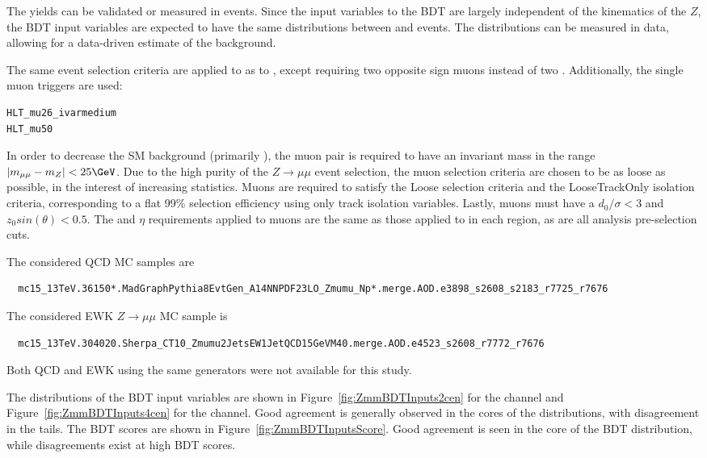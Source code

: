 \label{sec:zjets}
The \zjets{} yields can be validated or measured in \zmujets{} events. 
Since the input variables to the BDT are largely independent of the kinematics of the $Z$, 
the BDT input variables are expected to have the same distributions between \zmujets{} and \zjets{} events.
The \zmujets{} distributions can be measured in data, allowing for a data-driven estimate of the \zjets{} background.

The same event selection criteria are applied to \zmujets{} as to \zjets{}, except requiring two opposite sign muons 
instead of two \bjets.  Additionally, the single muon triggers are used:
\begin{verbatim}
HLT_mu26_ivarmedium
HLT_mu50
\end{verbatim}
In order to decrease the SM background (primarily \ttbar), the muon pair is required to have an invariant mass in the range $|m_{\mu\mu}-m_{Z}|<25\GeV$.
Due to the high purity of the $Z\rightarrow\mu\mu$ event selection, 
the muon selection criteria are chosen to be as loose as possible, in the interest of increasing statistics.
Muons are required to satisfy the Loose selection criteria and the LooseTrackOnly isolation criteria, 
corresponding to a flat 99\% selection efficiency using only track isolation variables.
Lastly, muons must have a $d_0/\sigma<3$ and $z_0sin(\theta)<0.5$.
The \pT and $\eta$ requirements applied to muons are the same as those applied to \bjets in each region, as are all analysis pre-selection cuts.  %

The considered QCD \zmujets{} MC samples are 
{
\scriptsize
\begin{verbatim}
  mc15_13TeV.36150*.MadGraphPythia8EvtGen_A14NNPDF23LO_Zmumu_Np*.merge.AOD.e3898_s2608_s2183_r7725_r7676
\end{verbatim}
}

The considered EWK $Z\rightarrow\mu\mu$ MC sample is
{
\scriptsize
\begin{verbatim}
  mc15_13TeV.304020.Sherpa_CT10_Zmumu2JetsEW1JetQCD15GeVM40.merge.AOD.e4523_s2608_r7772_r7676
\end{verbatim}
}

Both QCD and EWK \zmujets{} using the same generators were not available for this study.


The distributions of the BDT input variables are shown in Figure~\ref{fig:ZmmBDTInputs2cen} for the \twocentral channel and 
Figure~\ref{fig:ZmmBDTInputs4cen} for the \fourcentral channel. 
Good agreement is generally observed in the cores of the distributions, with disagreement in the tails. 
The BDT scores are shown in Figure~\ref{fig:ZmmBDTInputsScore}.  Good agreement is seen in the core of the BDT distribution, while disagreements exist at high BDT scores.  

